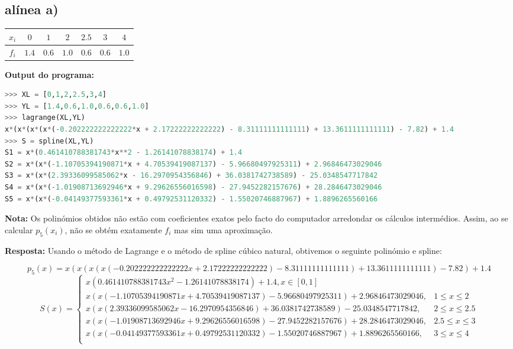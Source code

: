 \documentclass{article}
\begin{document}
\subsection*{alínea a)}
\begin{center}
\begin{tabular}{c|c c c c c c}


    $ x_{i} $ & $0$ & $1$ & $2$ & $2.5$ & $3$ & $4$ \\
    \hline
    $f_{i}$ & $1.4$ & $0.6$ & $1.0$ & $0.6$ & $0.6$ &$1.0$\\

\end{tabular}
\end{center}
\textbf{Output do programa:}
\begin{lstlisting}[language=Python]
>>> XL = [0,1,2,2.5,3,4]
>>> YL = [1.4,0.6,1.0,0.6,0.6,1.0]
>>> lagrange(XL,YL)
x*(x*(x*(x*(-0.202222222222222*x + 2.17222222222222) - 8.31111111111111) + 13.3611111111111) - 7.82) + 1.4
>>> S = spline(XL,YL)
S1 = x*(0.461410788381743*x**2 - 1.26141078838174) + 1.4
S2 = x*(x*(-1.10705394190871*x + 4.70539419087137) - 5.96680497925311) + 2.96846473029046
S3 = x*(x*(2.39336099585062*x - 16.2970954356846) + 36.0381742738589) - 25.0348547717842
S4 = x*(x*(-1.01908713692946*x + 9.29626556016598) - 27.9452282157676) + 28.2846473029046
S5 = x*(x*(-0.04149377593361*x + 0.49792531120332) - 1.55020746887967) + 1.8896265560166
\end{lstlisting}
\textbf{Nota:} Os polinómios obtidos não estão com coeficientes exatos pelo facto do computador arredondar os cálculos intermédios. Assim, ao se calcular $p_5(x_i)$, não se obtém exatamente $f_i$ mas sim uma aproximação.
\newpage
\begin{flushleft}
  \textbf{Resposta:} Usando o método de Lagrange e o método de spline cúbico natural, obtivemos o seguinte polinómio e spline:
\end{flushleft}
\[p_{5}(x) = x(x(x(x(-0.202222222222222x+2.17222222222222)-8.31111111111111)+13.3611111111111)-7.82)+1.4\]
\[S(x) = \begin{cases}
x(0.461410788381743x^2 - 1.26141078838174) + 1.4 , x\in[0,1]\\
x(x(-1.10705394190871x + 4.70539419087137) - 5.96680497925311) + 2.96846473029046, & 1\leq x\leq 2 \\
x(x(2.39336099585062x - 16.2970954356846) + 36.0381742738589) - 25.0348547717842, & 2\leq x\leq 2.5\\
x(x(-1.01908713692946x + 9.29626556016598) - 27.9452282157676) + 28.2846473029046, & 2.5\leq x\leq 3\\
x(x(-0.04149377593361x + 0.49792531120332) - 1.55020746887967) + 1.8896265560166, & 3\leq x\leq 4\\
\end{cases}\]
\end{document}
